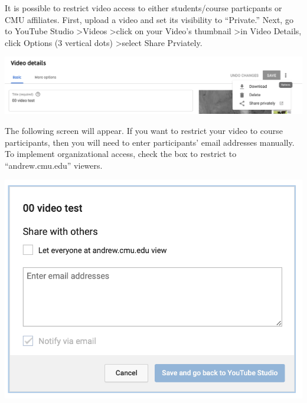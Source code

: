 \begin{gram}
    It is possible to restrict video access to either students/course particpants or CMU affiliates.
    First, upload a video and set its visibility to ``Private.''
    Next, go to YouTube Studio \textgreater Videos \textgreater click on your Video's thumbnail \textgreater in Video Details, click Options (3 vertical dots) \textgreater select Share Prviately.

    {
        \centering
        \includegraphics[scale=0.4]{youtube/media/10-youtube-private-access-1.png}
    }

    The following screen will appear.
    If you want to restrict your video to course participants, then you will need to enter participants' email addresses manually.
    To implement organizational access, check the box to restrict to ``andrew.cmu.edu'' viewers.

    {
        \centering
        \includegraphics[scale=0.4]{youtube/media/11-youtube-private-access-2.png}
    }
\end{gram}
